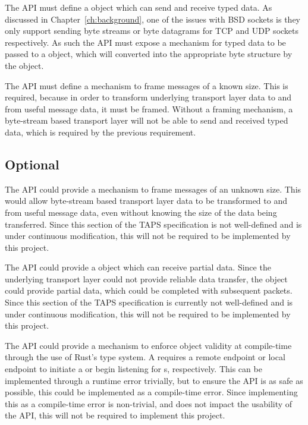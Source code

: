 The API must define a \connection{} object which can send and receive typed data.
As discussed in Chapter~\ref{ch:background}, one of the issues with BSD sockets is they only support sending byte
streams or byte datagrams for TCP and UDP sockets respectively.
As such the API must expose a mechanism for typed data to be passed to a \connection{} object, which will converted into
the appropriate byte structure by the \connection{} object.

The API must define a mechanism to frame messages of a known size.
This is required, because in order to transform underlying transport layer data to and from useful message data,
it must be framed.
Without a framing mechanism, a byte-stream based transport layer will not be able to send and received typed data,
which is required by the previous requirement.

\subsection{Optional}\label{subsec:optional}

The API could provide a mechanism to frame messages of an unknown size.
This would allow byte-stream based transport layer data to be transformed to and from useful message data, even without
knowing the size of the data being transferred.
Since this section of the TAPS specification is not well-defined and is under continuous modification, this will not be
required to be implemented by this project.

The API could provide a \connection{} object which can receive partial data.
Since the underlying transport layer could not provide reliable data transfer, the \connection{} object could provide
partial data, which could be completed with subsequent packets.
Since this section of the TAPS specification is currently not well-defined and is under continuous modification, this
will not be required to be implemented by this project.

The API could provide a mechanism to enforce \preconnection{} object validity at compile-time through the use of Rust's
type system.
A \preconnection{} requires a remote endpoint or local endpoint to initiate a \connection{} or begin listening for
\connection{}s, respectively.
This can be implemented through a runtime error trivially, but to ensure the API is as safe as possible, this could be
implemented as a compile-time error.
Since implementing this as a compile-time error is non-trivial, and does not impact the usability of the API, this will
not be required to implement this project.

